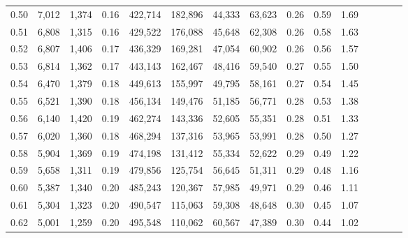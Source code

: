 \begin{tabular}{rrrcrrrrrrrrrrr}
0.50 &   7,012 &   1,374 &                                       0.16 &  422,714 &  182,896 &   44,333 &   63,623 &  0.26 &  0.59 &                         1.69 \\
0.51 &   6,808 &   1,315 &                                       0.16 &  429,522 &  176,088 &   45,648 &   62,308 &  0.26 &  0.58 &                         1.63 \\
0.52 &   6,807 &   1,406 &                                       0.17 &  436,329 &  169,281 &   47,054 &   60,902 &  0.26 &  0.56 &                         1.57 \\
0.53 &   6,814 &   1,362 &                                       0.17 &  443,143 &  162,467 &   48,416 &   59,540 &  0.27 &  0.55 &                         1.50 \\
0.54 &   6,470 &   1,379 &                                       0.18 &  449,613 &  155,997 &   49,795 &   58,161 &  0.27 &  0.54 &                         1.45 \\
0.55 &   6,521 &   1,390 &                                       0.18 &  456,134 &  149,476 &   51,185 &   56,771 &  0.28 &  0.53 &                         1.38 \\
0.56 &   6,140 &   1,420 &                                       0.19 &  462,274 &  143,336 &   52,605 &   55,351 &  0.28 &  0.51 &                         1.33 \\
0.57 &   6,020 &   1,360 &                                       0.18 &  468,294 &  137,316 &   53,965 &   53,991 &  0.28 &  0.50 &                         1.27 \\
0.58 &   5,904 &   1,369 &                                       0.19 &  474,198 &  131,412 &   55,334 &   52,622 &  0.29 &  0.49 &                         1.22 \\
0.59 &   5,658 &   1,311 &                                       0.19 &  479,856 &  125,754 &   56,645 &   51,311 &  0.29 &  0.48 &                         1.16 \\
0.60 &   5,387 &   1,340 &                                       0.20 &  485,243 &  120,367 &   57,985 &   49,971 &  0.29 &  0.46 &                         1.11 \\
0.61 &   5,304 &   1,323 &                                       0.20 &  490,547 &  115,063 &   59,308 &   48,648 &  0.30 &  0.45 &                         1.07 \\
0.62 &   5,001 &   1,259 &                                       0.20 &  495,548 &  110,062 &   60,567 &   47,389 &  0.30 &  0.44 &                         1.02 \\

\end{tabular}
